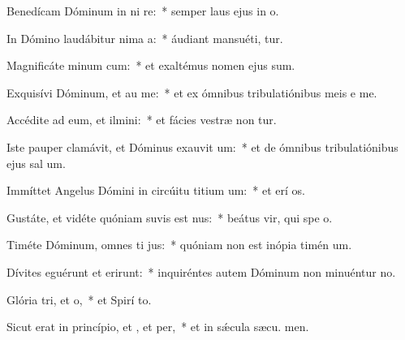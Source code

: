 \item Benedícam Dóminum in ni re:~* semper laus ejus in  o.
\item In Dómino laudábitur nima a:~* áudiant mansuéti,  tur.
\item Magnificáte minum cum:~* et exaltémus nomen ejus  sum.
\item Exquisívi Dóminum, et au me:~* et ex ómnibus tribulatiónibus meis e me.
\item Accédite ad eum, et ilmini:~* et fácies vestræ non tur.
\item Iste pauper clamávit, et Dóminus exauvit um:~* et de ómnibus tribulatiónibus ejus sal um.
\item Immíttet Angelus Dómini in circúitu titium um:~* et erí os.
\item Gustáte, et vidéte quóniam suvis est nus:~* beátus vir, qui spe  o.
\item Timéte Dóminum, omnes ti jus:~* quóniam non est inópia timén um.
\item Dívites eguérunt et erirunt:~* inquiréntes autem Dóminum non minuéntur  no.
\item Glória tri, et o,~* et Spirí to.
\item Sicut erat in princípio, et , et per,~* et in sǽcula sæcu. men.
